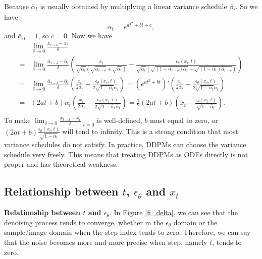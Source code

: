 \documentclass{article}
\begin{document}
Because $\bar{\alpha}_t$ is usually obtained by multiplying a linear variance schedule $\beta_t$. So we have 
\begin{equation}
   \bar{\alpha}_t = e^{at^2+bt+c},
\end{equation}
and $\bar{\alpha}_0 = 1$, so $c = 0$. Now we have
\begin{equation}
   \begin{split}
       & \lim _{\delta \rightarrow 0} \frac{x_{t-\delta}-x_{t}}{\delta} \\
      =& \lim _{\delta \rightarrow 0} \frac{\bar{\alpha}_{t-\delta}-\bar{\alpha}_t}{\delta} \left(\frac{x_t}{\sqrt{\bar{\alpha}_t}(\sqrt{\bar{\alpha}_{t-\delta}}+\sqrt{\bar{\alpha}_t})} - 
         \frac{\epsilon_\theta(x_t, t)}{\sqrt{\bar{\alpha}_t}(\sqrt{(1-\bar{\alpha}_{t-\delta})\bar{\alpha}_{t}} + \sqrt{(1-\bar{\alpha}_{t})\bar{\alpha}_{t-\delta}})}\right) \\
      =& \lim _{\delta \rightarrow 0} \frac{\bar{\alpha}_{t-\delta}-\bar{\alpha}_t}{\delta} \left(\frac{x_t}{2\bar{\alpha}_t} - 
         \frac{\epsilon_\theta(x_t, t)}{2\sqrt{1-\bar{\alpha}_{t}}\bar{\alpha}_{t}}\right) = (e^{at^2+bt})' \left(\frac{x_t}{2\bar{\alpha}_t} - \frac{\epsilon_\theta(x_t, t)}{2\sqrt{1-\bar{\alpha}_{t}}\bar{\alpha}_{t}} \right) \\
      =& (2at+b)\bar{\alpha}_t \left(\frac{x_t}{2\bar{\alpha}_t} - \frac{\epsilon_\theta(x_t, t)}{2\sqrt{1-\bar{\alpha}_{t}}\bar{\alpha}_{t}} \right) 
      =  \frac{1}{2}(2at+b)(x_t - \frac{\epsilon_\theta(x_t, t)}{\sqrt{1-\bar{\alpha}_t}}). \\
   \end{split}
\end{equation}
To make $\lim _{\delta \rightarrow 0} \frac{x_{t-\delta}-x_{t}}{\delta}|_{t=0}$ is well-defined, $b$ must equal to zero, or $(2at+b)\frac{\epsilon_\theta(x_t, t)}{\sqrt{1-\bar{\alpha}_t}}$ will tend to infinity. This is a strong condition that most variance schedules do not satisfy. In practice, DDPMs can choose the variance schedule very freely. This means that treating DDPMs as ODEs directly is not proper and has theoretical weakness.

\subsection{Relationship between $t$, $\epsilon_\theta$ and $x_t$}
\label{sec_epsi}

\textbf{Relationship between $t$ and $\epsilon_\theta$}. In Figure \ref{fi_delta}, we can see that the denoising process tends to converge, whether in the $\epsilon_\theta$ domain or the sample/image domain when the step-index tends to zero. Therefore, we can say that the noise becomes more and more precise when step, namely $t$, tends to zero.
\end{document}
